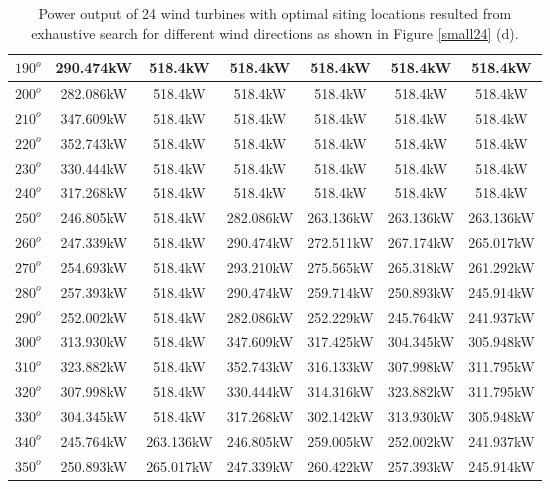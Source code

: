 \begin{table}[H]
\begin{tabular}{|c|c|c|c|c|c|c|}
		$190^o$	& 290.474kW	& 518.4kW	& 518.4kW	& 518.4kW	& 518.4kW	& 518.4kW	\\ \hline
		$200^o$	& 282.086kW	& 518.4kW	& 518.4kW	& 518.4kW	& 518.4kW	& 518.4kW	\\ \hline
		$210^o$	& 347.609kW	& 518.4kW	& 518.4kW	& 518.4kW	& 518.4kW	& 518.4kW	\\ \hline
		$220^o$	& 352.743kW	& 518.4kW	& 518.4kW	& 518.4kW	& 518.4kW	& 518.4kW	\\ \hline
		$230^o$	& 330.444kW	& 518.4kW	& 518.4kW	& 518.4kW	& 518.4kW	& 518.4kW	\\ \hline
		$240^o$	& 317.268kW	& 518.4kW	& 518.4kW	& 518.4kW	& 518.4kW	& 518.4kW	\\ \hline
		$250^o$	& 246.805kW	& 518.4kW	& 282.086kW	& 263.136kW	& 263.136kW	& 263.136kW	\\ \hline
		$260^o$	& 247.339kW	& 518.4kW	& 290.474kW	& 272.511kW	& 267.174kW	& 265.017kW	\\ \hline
		$270^o$	& 254.693kW	& 518.4kW	& 293.210kW	& 275.565kW	& 265.318kW	& 261.292kW	\\ \hline
		$280^o$	& 257.393kW	& 518.4kW	& 290.474kW	& 259.714kW	& 250.893kW	& 245.914kW	\\ \hline
		$290^o$	& 252.002kW	& 518.4kW	& 282.086kW	& 252.229kW	& 245.764kW	& 241.937kW	\\ \hline
		$300^o$	& 313.930kW	& 518.4kW	& 347.609kW	& 317.425kW	& 304.345kW	& 305.948kW	\\ \hline
		$310^o$	& 323.882kW	& 518.4kW	& 352.743kW	& 316.133kW	& 307.998kW	& 311.795kW	\\ \hline
		$320^o$	& 307.998kW	& 518.4kW	& 330.444kW	& 314.316kW	& 323.882kW	& 311.795kW	\\ \hline
		$330^o$	& 304.345kW	& 518.4kW	& 317.268kW	& 302.142kW	& 313.930kW	& 305.948kW	\\ \hline
		$340^o$	& 245.764kW	& 263.136kW	& 246.805kW	& 259.005kW	& 252.002kW	& 241.937kW	\\ \hline
		$350^o$	& 250.893kW	& 265.017kW	& 247.339kW	& 260.422kW	& 257.393kW	& 245.914kW	\\ \hline
        	\end{tabular}
        	\caption{Power output of 24 wind turbines with optimal siting locations resulted from exhaustive search for different wind directions as shown in Figure \ref{small24} (d).}
        	\label{table24d}
        \end{table}
        \doublespacing
        
